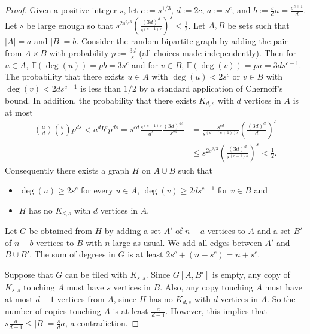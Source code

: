 \documentclass[oneside,12pt]{memoir}
\begin{document}
\begin{proof}
Given a positive integer $s$, let $c:=s^{1/3}$, $d:=2c$, $a := s^c$, and $b := \frac{s}{d}a=\frac{s^{c+1}}{d}$. Let $s$ be large enough so that $s^{2s^{2/3}}\left(\frac{(3d)^{d}}{s^{(c-1)s}}\right)^{s}<\frac{1}{2}$.
Let $A, B$ be sets such that $|A| = a$ and $|B| = b$. Consider the random bipartite graph by adding the pair from $A \times B$ with
probability $p := \frac{3d}{s}$ (all choices made independently). Then for $u\in A$,
$\mathbb{E}(\deg(u)) = pb = 3s^c$ and for $v\in B$, $\mathbb{E}(\deg(v)) = pa = 3ds^{c-1}$.  The probability that there exists $u\in A$ with $\deg(u) < 2s^c$ or $v \in B$ with $\deg(v) < 2ds^{c-1}$ %
is less than $1/2$ by a standard application of Chernoff's bound. In addition,
the probability that there exists $K_{d,s}$ with $d$ vertices in $A$ is at most
\begin{align*}
\binom{a}{d}\binom{b}{s}p^{ds}<a^d b^s p^{ds}=s^{cd} \frac{s^{(c+1)s}}{d^s} \frac{(3d)^{ds}}{s^{ds}}&=\frac{s^{cd}}{s^{(d-(c+1))s}}\left(\frac{(3d)^d}{d}\right)^s \\
&\leq s^{2s^{2/3}}\left(\frac{(3d)^d}{s^{(c-1)s}}\right)^s <\frac{1}{2}.
\end{align*}
Consequently there exists a graph $H$ on $A\cup B$ such that
\begin{itemize}
\item $\deg(u) \geq 2s^c$ for every $u \in A$, $\deg(v) \geq 2ds^{c-1}$ for $v \in B$ and
\item  $H$ has no $K_{d,s}$ with $d$ vertices in $A$.
\end{itemize}

Let $G$ be obtained from $H$ by adding a set $A'$ of $n - a$ vertices to $A$ and a set $B'$ of $n-b$ vertices to $B$ with $n$ large as usual. We add all edges between $A'$ and $B\cup B'$.  The sum of degrees in $G$ is at least $2s^c+(n-s^c)= n + s^c$.   

Suppose that $G$ can be tiled with $K_{s,s}$.  Since $G[A, B']$ is empty, any copy of $K_{s,s}$ touching $A$ must have $s$ vertices in $B$.  Also, any copy touching $A$ must have at most $d-1$ vertices from $A$, since $H$ has no $K_{d,s}$ with $d$ vertices in $A$.  So the number of copies touching $A$ is at least $\frac{a}{d-1}$.  However, this implies that $s\frac{a}{d-1}\leq |B|= \frac{s}{d}a$, a contradiction.
\end{proof}
\end{document}
